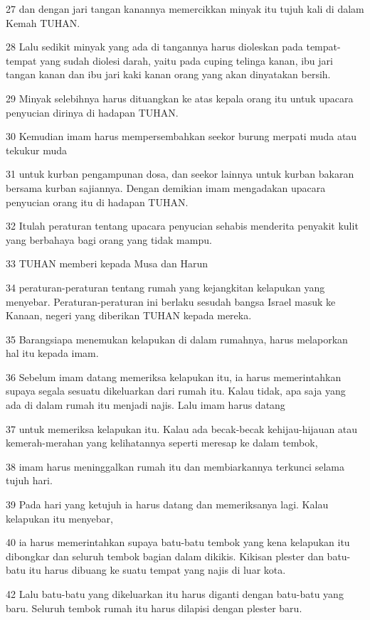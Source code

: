 \par 27 dan dengan jari tangan kanannya memercikkan minyak itu tujuh kali di dalam Kemah TUHAN.
\par 28 Lalu sedikit minyak yang ada di tangannya harus dioleskan pada tempat-tempat yang sudah diolesi darah, yaitu pada cuping telinga kanan, ibu jari tangan kanan dan ibu jari kaki kanan orang yang akan dinyatakan bersih.
\par 29 Minyak selebihnya harus dituangkan ke atas kepala orang itu untuk upacara penyucian dirinya di hadapan TUHAN.
\par 30 Kemudian imam harus mempersembahkan seekor burung merpati muda atau tekukur muda
\par 31 untuk kurban pengampunan dosa, dan seekor lainnya untuk kurban bakaran bersama kurban sajiannya. Dengan demikian imam mengadakan upacara penyucian orang itu di hadapan TUHAN.
\par 32 Itulah peraturan tentang upacara penyucian sehabis menderita penyakit kulit yang berbahaya bagi orang yang tidak mampu.
\par 33 TUHAN memberi kepada Musa dan Harun
\par 34 peraturan-peraturan tentang rumah yang kejangkitan kelapukan yang menyebar. Peraturan-peraturan ini berlaku sesudah bangsa Israel masuk ke Kanaan, negeri yang diberikan TUHAN kepada mereka.
\par 35 Barangsiapa menemukan kelapukan di dalam rumahnya, harus melaporkan hal itu kepada imam.
\par 36 Sebelum imam datang memeriksa kelapukan itu, ia harus memerintahkan supaya segala sesuatu dikeluarkan dari rumah itu. Kalau tidak, apa saja yang ada di dalam rumah itu menjadi najis. Lalu imam harus datang
\par 37 untuk memeriksa kelapukan itu. Kalau ada becak-becak kehijau-hijauan atau kemerah-merahan yang kelihatannya seperti meresap ke dalam tembok,
\par 38 imam harus meninggalkan rumah itu dan membiarkannya terkunci selama tujuh hari.
\par 39 Pada hari yang ketujuh ia harus datang dan memeriksanya lagi. Kalau kelapukan itu menyebar,
\par 40 ia harus memerintahkan supaya batu-batu tembok yang kena kelapukan itu dibongkar dan seluruh tembok bagian dalam dikikis. Kikisan plester dan batu-batu itu harus dibuang ke suatu tempat yang najis di luar kota.
\par 42 Lalu batu-batu yang dikeluarkan itu harus diganti dengan batu-batu yang baru. Seluruh tembok rumah itu harus dilapisi dengan plester baru.
